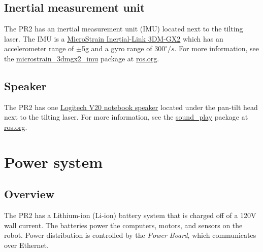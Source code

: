 \subsection{Inertial measurement unit}
The PR2 has an inertial measurement unit (IMU) located next to the tilting
laser. The IMU is a \href{http://www.microstrain.com/3dm-gx2.aspx}{MicroStrain
  Inertial-Link 3DM-GX2} which has an accelerometer range of $\pm$5g and a gyro
range of $300^\circ/s$. For more information, see the
\href{http://www.ros.org/wiki/microstrain_3dmgx2_imu}{microstrain\_3dmgx2\_imu}
package at \href{http://www.ros.org}{ros.org}.

\subsection{Speaker}
The PR2 has one
\href{http://www.logitech.com/index.cfm/speakers_audio/home_pc_speakers/devices/199&cl=us,en}{Logitech
  V20 notebook speaker} located under the pan-tilt head next to the tilting
laser. For more information, see the
\href{http://www.ros.org/wiki/sound_play}{sound\_play} package at
\href{http://www.ros.org}{ros.org}.

\section{Power system}
\subsection{Overview}
The PR2 has a Lithium-ion (Li-ion) battery system that is charged off of a 120V
wall current. The batteries power the computers, motors, and sensors on the
robot.  Power distribution is controlled by the \emph{Power Board}, which
communicates over Ethernet.
